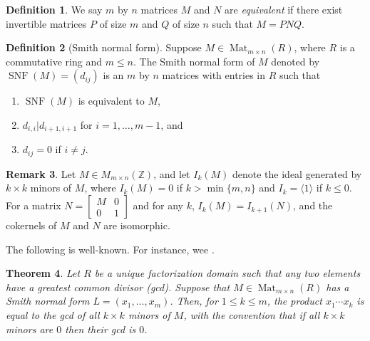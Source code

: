 \documentclass[11pt,reqno]{amsart}
\DeclareMathOperator{\snf}{SNF}
\newcommand{\angles}[1]{\langle #1 \rangle}
\theoremstyle{definition}
\newtheorem{mydef}{Definition}[section]
\newtheorem{rmk}[mydef]{Remark}
\theoremstyle{plain}
\newtheorem{mytheorem}[mydef]{Theorem}
\begin{document}
\begin{mydef}
We say $m$ by $n$ matrices $M$ and $N$ are \textit{equivalent} if there exist invertible matrices $P$ of size $m$ and $Q$ of size $n$ such that $M = PNQ$.
\end{mydef}

\begin{mydef}[Smith normal form]
Suppose $M \in \operatorname{Mat}_{m \times n}(R)$, where $R$ is a commutative ring and $m \le n$.
The Smith normal form of $M$ denoted by  $\snf(M) = (d_{ij})$ is an $m$ by $n$ matrices with entries in $R$ such that 
\begin{enumerate}
    \item $\snf(M)$ is equivalent to $M$,
    \item $d_{i,i} | d_{i+1,i+1}$ for $i = 1, \dots, m-1$, and
    \item $d_{ij} = 0$ if $i\neq j$. 
\end{enumerate}
\end{mydef}

\begin{rmk}\label{remark: embedding}
Let $M \in M_{m \times n}(\mathbb{Z})$, 
and let $I_k(M)$ denote the ideal generated by $k \times k$ minors of $M$, 
where $I_k(M) = 0$ if $k > \min\{m,n\}$ and $I_k = \angles{1}$ if $k \le 0$. 
For a matrix $N = \left[ \begin{array}{c|c}
M & 0 \\
\hline
0 & 1
\end{array} \right]$ and for any $k$, $I_k(M) = I_{k+1}(N)$, and the cokernels of $M$ and $N$ are isomorphic. 
\end{rmk}

The following is well-known. For instance, wee \cite[Theorem 2.4]{stanley2016smith}.

\begin{mytheorem}\label{theorem: gcd theorem}
Let $R$ be a unique factorization domain such that any two elements have a greatest common divisor (gcd). 
Suppose that $M \in \operatorname{Mat}_{m \times n}(R)$ has a Smith normal form $L=(x_1,\dots,x_m)$. 
Then, for $1\leq k \leq m$, the product $x_1 \cdots x_k$ is equal to the gcd of all $k\times k$ minors of $M$, with the convention that if all $k\times k$ minors are $0$ then their gcd is $0$. 
\end{mytheorem}

\end{document}
